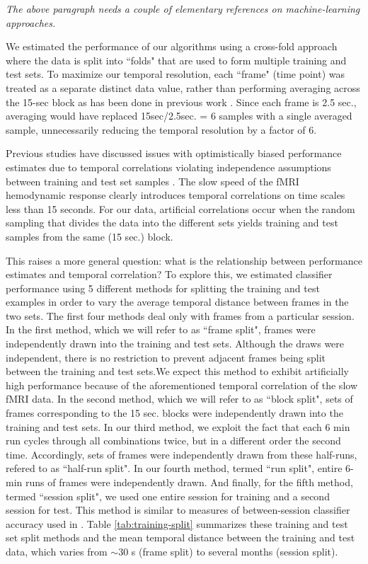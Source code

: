 \documentclass[preprint,5p,authoryear]{elsarticle}
\begin{document}
\emph{The above paragraph needs a couple of elementary references on machine-learning approaches.}

We estimated the performance of our algorithms using a cross-fold approach \citep{Kohavi1995} where the data is split into ``folds" that are used to form multiple training and test sets.
To maximize our temporal resolution, each ``frame" (time point) was treated as a separate distinct data value, rather than performing averaging across the 15-sec block as has been done in previous work \citep{BlockAveraging}.
Since each frame is 2.5 sec., averaging would have replaced 15sec/2.5sec. = 6 samples with a single averaged sample, unnecessarily reducing the temporal resolution by a factor of 6.

Previous studies have discussed issues with optimistically biased performance estimates due to temporal correlations violating independence assumptions between training and test set samples \citep{Pereira2009}. The slow speed of the fMRI hemodynamic response clearly introduces temporal correlations on time scales less than 15 seconds.
For our data, artificial correlations occur when the random sampling that divides the data into the different sets yields training and test samples from the same (15 sec.) block.

This raises a more general question: what is the relationship between performance estimates and temporal correlation?
To explore this, we estimated classifier performance using 5 different methods for splitting the training and test examples in order to vary the average temporal distance between frames in the two sets. 
The first four methods deal only with frames from a particular session.
In the first method, which we will refer to as  ``frame split", frames were independently drawn into the training and test sets. 
Although the draws were independent, there is no restriction to prevent adjacent frames being split between the training and test sets.We expect this method to exhibit artificially high performance because of the aforementioned temporal correlation of the slow fMRI data.
In the second method, which we will refer to as ``block split", sets of frames corresponding to the 15 sec. blocks were independently drawn into the training and test sets.
In our third method, we exploit the fact that each 6 min run cycles through all combinations twice, but in a different order the second time.
Accordingly, sets of frames were independently drawn from these half-runs, refered to as ``half-run split". 
In our fourth method, termed ``run split", entire 6-min runs of frames were independently drawn. 
And finally, for the fifth method, termed ``session split", we used one entire session for training and a second session for test.
This method is similar to measures of between-session classifier accuracy used in \citep{BetweenSessionAccuracy}.
Table \ref{tab:training-split} summarizes these training and test set split methods and the mean temporal distance between the training and test data, which varies from $\sim$30 s (frame split) to several months (session split).
\end{document}
